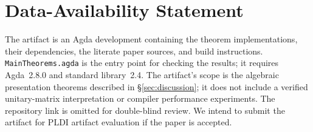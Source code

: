 \section*{Data-Availability Statement}

The artifact is an Agda development containing the theorem implementations,
their dependencies, the literate paper sources, and build instructions.
\texttt{MainTheorems.agda} is the entry point for checking the results;
it requires Agda~2.8.0 and standard library~2.4.  The artifact's scope is
the algebraic presentation theorems described in
\S\ref{sec:discussion}; it does not include a verified unitary-matrix
interpretation or compiler performance experiments.  The repository
link is omitted for double-blind review.  We intend to submit the
artifact for PLDI artifact evaluation if the paper is accepted.
